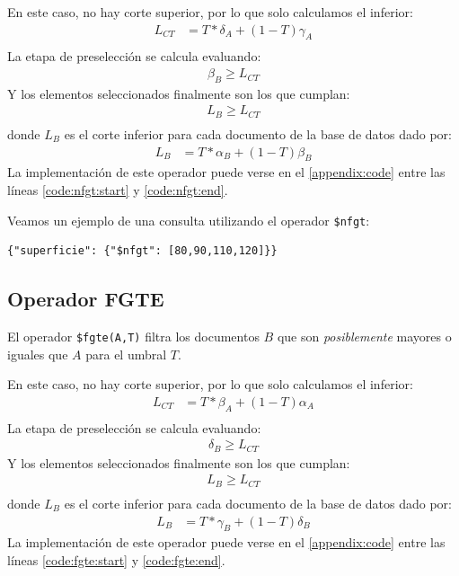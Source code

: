 En este caso, no hay corte superior, por lo que solo calculamos el inferior:
%
\begin{align*}
    L_{CT} &= T * \delta_A + (1-T)\gamma_A \\
\end{align*}
%
La etapa de preselección se calcula evaluando:
%
\begin{align*}
    \beta_B \geq L_{CT}
\end{align*}
%
Y los elementos seleccionados finalmente son los que cumplan:
%
\begin{align*}
    L_B \geq L_{CT} \\
\end{align*}
%
donde $L_B$ es el corte inferior para cada documento de la base de datos dado por:
%
\begin{align*}
    L_B &= T * \alpha_B + (1-T)\beta_B
\end{align*}
%
La implementación de este operador puede verse en el \autoref{appendix:code} entre las líneas \ref{code:nfgt:start} y \ref{code:nfgt:end}.

\begin{example}
Veamos un ejemplo de una consulta utilizando el operador \texttt{\$nfgt}:
%
\begin{verbatim}
{"superficie": {"$nfgt": [80,90,110,120]}}
\end{verbatim}

\end{example}

\subsection{Operador FGTE}

El operador \texttt{\$fgte(A,T)} filtra los documentos $B$ que son \textit{posiblemente} mayores o iguales que $A$ para el umbral $T$.

En este caso, no hay corte superior, por lo que solo calculamos el inferior:
%
\begin{align*}
    L_{CT} &= T * \beta_A + (1-T)\alpha_A \\
\end{align*}
%
La etapa de preselección se calcula evaluando:
%
\begin{align*}
    \delta_B \geq L_{CT}
\end{align*}
%
Y los elementos seleccionados finalmente son los que cumplan:
%
\begin{align*}
    L_B \geq L_{CT} \\
\end{align*}
%
donde $L_B$ es el corte inferior para cada documento de la base de datos dado por:
%
\begin{align*}
    L_B &= T * \gamma_B + (1-T)\delta_B
\end{align*}
%
La implementación de este operador puede verse en el \autoref{appendix:code} entre las líneas \ref{code:fgte:start} y \ref{code:fgte:end}.

